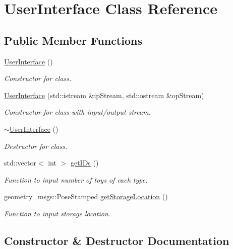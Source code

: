 \hypertarget{classUserInterface}{}\section{User\+Interface Class Reference}
\label{classUserInterface}
\subsection*{Public Member Functions}
\begin{DoxyCompactItemize}
\item 
\hyperlink{classUserInterface_ae6fb70370701b3bd6120e923df9705b0}{User\+Interface} ()
\begin{DoxyCompactList}\small\item\em Constructor for class. \end{DoxyCompactList}\item 
\hyperlink{classUserInterface_a4b98ae4a76dd81ba63ad1b26950c0035}{User\+Interface} (std\+::istream \&ip\+Stream, std\+::ostream \&op\+Stream)
\begin{DoxyCompactList}\small\item\em Constructor for class with input/output stream. \end{DoxyCompactList}\item 
\hyperlink{classUserInterface_ae588b2ff1711a016dd4c6fc5002c0841}{$\sim$\+User\+Interface} ()
\begin{DoxyCompactList}\small\item\em Destructor for class. \end{DoxyCompactList}\item 
std\+::vector$<$ int $>$ \hyperlink{classUserInterface_ac7a89f90361801ad7c4b62876aa47692}{get\+I\+Ds} ()
\begin{DoxyCompactList}\small\item\em Function to input number of toys of each type. \end{DoxyCompactList}\item 
geometry\+\_\+msgs\+::\+Pose\+Stamped \hyperlink{classUserInterface_aae35dee63d6a8795b3557729866dabb4}{get\+Storage\+Location} ()
\begin{DoxyCompactList}\small\item\em Function to input storage location. \end{DoxyCompactList}\end{DoxyCompactItemize}


\subsection{Constructor \& Destructor Documentation}

